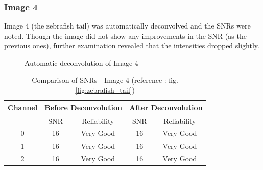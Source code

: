 \documentclass{article}
\begin{document}
\subsubsection*{Image 4}
Image 4 (the zebrafish tail) was automatically deconvolved and the SNRs were noted. Though the image did not show any improvements in the SNR (as the previous ones), further examination revealed that the intensities dropped slightly. 
\begin{figure}[h!]
\centering
{}
\vspace{5 mm}
\caption{Automatic deconvolution of Image 4}
\label{fig:auto-deconvolve-image4}
\end{figure}
\begin{table}[h!]
\centering
\caption{Comparison of SNRs - Image 4 (reference : fig. \ref{fig:zebrafish_tail})}
\begin{tabular}{*5c}
\toprule
Channel &  \multicolumn{2}{c}{Before Deconvolution} & \multicolumn{2}{c}{After Deconvolution}\\
\midrule
{}   & SNR   & Reliability    & SNR   & Reliability \\
0   &  16 & Very Good & 16 & Very Good \\
1   &  16 & Very Good & 16 & Very Good \\
2   &  16 & Very Good & 16 & Very Good \\
\bottomrule
\end{tabular}
\end{table}
\end{document}
